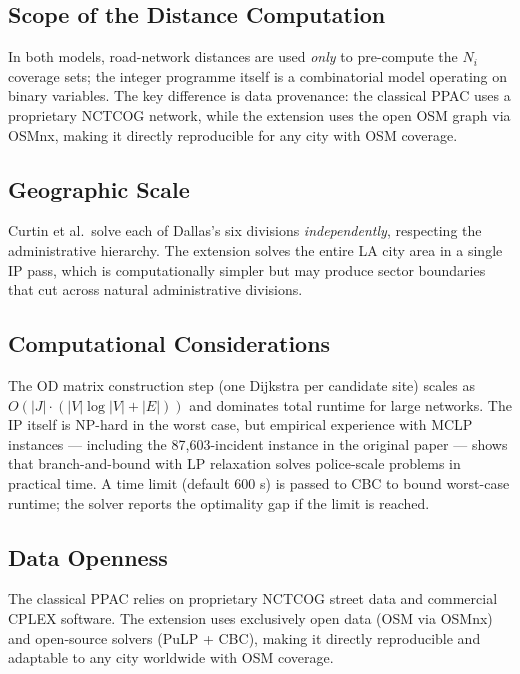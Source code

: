 \documentclass[12pt]{article}
\begin{document}
\subsection{Scope of the Distance Computation}

In both models, road-network distances are used \emph{only} to pre-compute the
$N_i$ coverage sets; the integer programme itself is a combinatorial model
operating on binary variables.  The key difference is data provenance: the
classical PPAC uses a proprietary NCTCOG network, while the extension uses the
open OSM graph via OSMnx, making it directly reproducible for any city with
OSM coverage.

\subsection{Geographic Scale}

Curtin et al.\ solve each of Dallas's six divisions \emph{independently},
respecting the administrative hierarchy.  The extension solves the entire LA
city area in a single IP pass, which is computationally simpler but may produce
sector boundaries that cut across natural administrative divisions.

\subsection{Computational Considerations}

The OD matrix construction step (one Dijkstra per candidate site) scales as
$O(|J| \cdot (|V|\log|V| + |E|))$ and dominates total runtime for large
networks.  The IP itself is NP-hard in the worst case, but empirical experience
with MCLP instances --- including the 87,603-incident instance in the original
paper --- shows that branch-and-bound with LP relaxation solves police-scale
problems in practical time.  A time limit (default 600 s) is passed to CBC
to bound worst-case runtime; the solver reports the optimality gap if the limit
is reached.

\subsection{Data Openness}

The classical PPAC relies on proprietary NCTCOG street data and commercial
CPLEX software.  The extension uses exclusively open data (OSM via OSMnx) and
open-source solvers (PuLP + CBC), making it directly reproducible and adaptable
to any city worldwide with OSM coverage.
\end{document}
